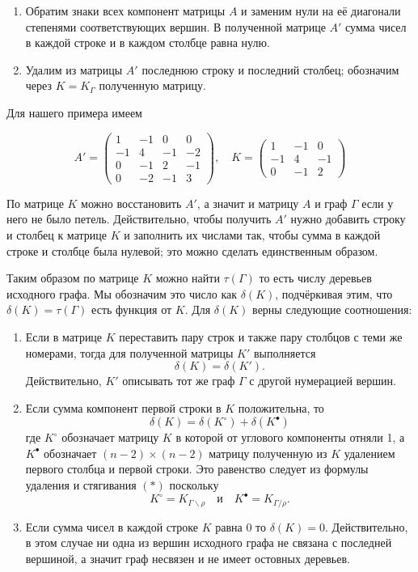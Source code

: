 \documentclass{article}
\begin{document}
\begin{enumerate}
\item Обратим знаки всех компонент матрицы $A$ и заменим нули на её диагонали степенями соответствующих вершин. 
В полученной матрице $A'$ сумма чисел в каждой строке и в каждом столбце равна нулю. 
\item Удалим из матрицы $A'$ последнюю строку и последний столбец;
обозначим через $K=K_\Gamma$ полученную матрицу.
\end{enumerate}

Для нашего примера имеем

\[A'=\left(
\begin{matrix}
1&-1&0&0
\\
-1&4&-1&-2
\\
0&-1&2&-1
\\
0&-2&-1&3
\end{matrix}
\right),
\quad 
K=\left(
\begin{matrix}
1&-1&0
\\
-1&4&-1
\\
0&-1&2
\end{matrix}
\right)\]

По матрице $K$ можно восстановить $A'$, а значит и матрицу $A$ и граф $\Gamma$ если у него не было петель.
Действительно, чтобы получить $A'$ нужно добавить строку и столбец к матрице $K$ и заполнить их числами так, чтобы сумма в каждой строке и столбце была нулевой;
это можно сделать единственным образом.

Таким образом по матрице $K$ можно найти $\tau(\Gamma)$ то есть числу деревьев исходного графа.
Мы обозначим это число как $\delta(K)$, подчёркивая этим, что $\delta(K)=\tau(\Gamma)$ есть функция от $K$.
Для $\delta(K)$ верны следующие соотношения:
\begin{enumerate}
\item Если в матрице $K$ переставить пару строк и также пару столбцов с теми же номерами,
тогда для полученной матрицы $K'$ выполняется 
\[\delta(K)=\delta(K').\]
Действительно, $K'$ описывать тот же граф $\Gamma$ с другой нумерацией вершин.
\item 
Если сумма компонент первой строки в $K$ положительна, то
\[\delta(K)=\delta(K^{\circ})+\delta(K^{\bullet})\]
где $K^{\circ}$ обозначает матрицу $K$ в которой от углового компоненты отняли 1, а $K^{\bullet}$ обозначает $(n-2)\times(n-2)$ матрицу полученную из $K$ удалением первого столбца и первой строки.
Это равенство следует из формулы удаления и стягивания $({*})$ поскольку \[K^{\circ}=K_{\Gamma\backslash\rho}\quad\text{и}\quad K^{\bullet}=K_{\Gamma/\rho}.\]
\item Если сумма чисел в каждой строке $K$ равна $0$ то $\delta(K)=0$. 
Действительно, в этом случае ни одна из вершин исходного графа не связана с последней вершиной, а значит граф несвязен и не имеет остовных деревьев.
\end{enumerate}
\end{document}
